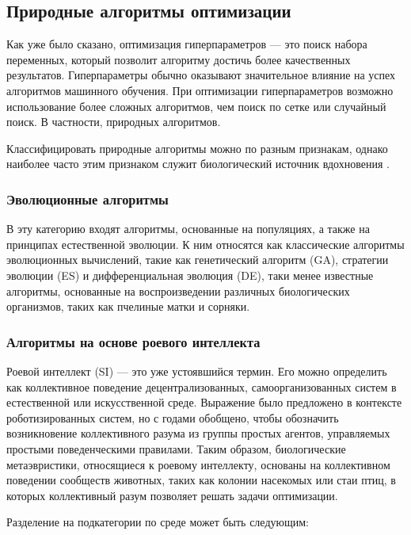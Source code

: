 \subsection{Природные алгоритмы оптимизации}

Как уже было сказано, оптимизация гиперпараметров — это поиск набора переменных, который позволит
алгоритму достичь более качественных результатов. Гиперпараметры обычно оказывают
значительное влияние на успех алгоритмов машинного обучения.
При оптимизации гиперпараметров возможно использование более сложных алгоритмов, 
чем поиск по сетке или случайный поиск. В частности, природных алгоритмов.

Классифицировать природные алгоритмы можно по разным признакам, однако наиболее
часто этим признаком служит биологический источник вдохновения \cite{BioInspiredTaxonomy}.

\subsubsection{Эволюционные алгоритмы}

В эту категорию входят алгоритмы, основанные на популяциях, а также
на принципах естественной эволюции. К ним относятся как
классические алгоритмы эволюционных вычислений, такие как генетический
алгоритм (GA), стратегии эволюции (ES) и дифференциальная эволюция (DE),
таки менее известные алгоритмы, основанные на воспроизведении
различных биологических организмов, таких как пчелиные матки и сорняки.

\subsubsection{Алгоритмы на основе роевого интеллекта}

Роевой интеллект (SI) — это уже устоявшийся термин. Его можно определить
как коллективное поведение децентрализованных, самоорганизованных систем в
естественной или искусственной среде. Выражение было предложено в контексте
роботизированных систем, но с годами обобщено, чтобы обозначить возникновение
коллективного разума из группы простых агентов, управляемых простыми поведенческими
правилами. Таким образом, биологические метаэвристики, относящиеся к роевому
интеллекту, основаны на коллективном поведении сообществ животных, таких как
колонии насекомых или стаи птиц, в которых коллективный разум позволяет решать
задачи оптимизации.

Разделение на подкатегории по среде может быть следующим:

